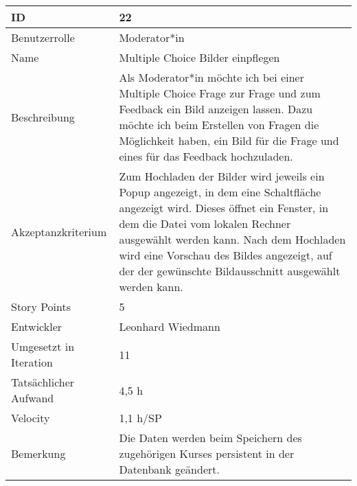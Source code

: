 \begin{tabularx}{\textwidth}{|p{}|X|}
	\hline
	ID & 22\\
	\hline
	Benutzerrolle & Moderator*in\\
	\hline
	Name & Multiple Choice Bilder einpflegen\\
	\hline
	Beschreibung & Als Moderator*in möchte ich bei einer Multiple Choice Frage zur Frage und zum Feedback ein Bild anzeigen lassen. Dazu möchte ich beim Erstellen von Fragen die Möglichkeit haben, ein Bild für die Frage und eines für das Feedback hochzuladen. \\
	\hline
	Akzeptanzkriterium & Zum Hochladen der Bilder wird jeweils ein Popup angezeigt, in dem eine Schaltfläche angezeigt wird. Dieses öffnet ein Fenster, in dem die Datei vom lokalen Rechner ausgewählt werden kann. Nach dem Hochladen wird eine Vorschau des Bildes angezeigt, auf der der gewünschte Bildausschnitt ausgewählt werden kann.\\
	\hline
	Story Points & 5 \\
	\hline
	Entwickler &  Leonhard Wiedmann\\
	\hline
	Umgesetzt in Iteration & 11\\
	\hline
	Tatsächlicher Aufwand & 4,5 h\\
	\hline
	Velocity & 1,1 h/SP\\
	\hline
	Bemerkung & Die Daten werden beim Speichern des zugehörigen Kurses persistent in der Datenbank geändert.\\
	\hline
\end{tabularx}
\vspace{20pt}
